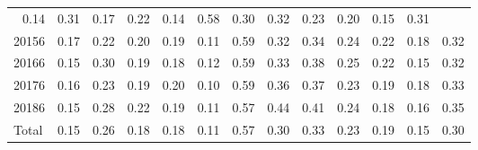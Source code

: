 \begin{table}[!h]
\begin{tabular}{lllllllllllll}
  \multicolumn{1}{|r}{0.14} &
  \multicolumn{1}{r}{0.31} &
  \multicolumn{1}{r}{0.17} &
  \multicolumn{1}{r}{0.22} &
  \multicolumn{1}{r}{0.14} &
  \multicolumn{1}{r}{0.58} &
  \multicolumn{1}{r}{0.30} &
  \multicolumn{1}{r}{0.32} &
  \multicolumn{1}{r}{0.23} &
  \multicolumn{1}{r}{0.20} &
  \multicolumn{1}{r}{0.15} &
  \multicolumn{1}{r}{0.31} \\
\multicolumn{1}{l}{\hspace{1em}20156} &
  \multicolumn{1}{|r}{0.17} &
  \multicolumn{1}{r}{0.22} &
  \multicolumn{1}{r}{0.20} &
  \multicolumn{1}{r}{0.19} &
  \multicolumn{1}{r}{0.11} &
  \multicolumn{1}{r}{0.59} &
  \multicolumn{1}{r}{0.32} &
  \multicolumn{1}{r}{0.34} &
  \multicolumn{1}{r}{0.24} &
  \multicolumn{1}{r}{0.22} &
  \multicolumn{1}{r}{0.18} &
  \multicolumn{1}{r}{0.32} \\
\multicolumn{1}{l}{\hspace{1em}20166} &
  \multicolumn{1}{|r}{0.15} &
  \multicolumn{1}{r}{0.30} &
  \multicolumn{1}{r}{0.19} &
  \multicolumn{1}{r}{0.18} &
  \multicolumn{1}{r}{0.12} &
  \multicolumn{1}{r}{0.59} &
  \multicolumn{1}{r}{0.33} &
  \multicolumn{1}{r}{0.38} &
  \multicolumn{1}{r}{0.25} &
  \multicolumn{1}{r}{0.22} &
  \multicolumn{1}{r}{0.15} &
  \multicolumn{1}{r}{0.32} \\
\multicolumn{1}{l}{\hspace{1em}20176} &
  \multicolumn{1}{|r}{0.16} &
  \multicolumn{1}{r}{0.23} &
  \multicolumn{1}{r}{0.19} &
  \multicolumn{1}{r}{0.20} &
  \multicolumn{1}{r}{0.10} &
  \multicolumn{1}{r}{0.59} &
  \multicolumn{1}{r}{0.36} &
  \multicolumn{1}{r}{0.37} &
  \multicolumn{1}{r}{0.23} &
  \multicolumn{1}{r}{0.19} &
  \multicolumn{1}{r}{0.18} &
  \multicolumn{1}{r}{0.33} \\
\multicolumn{1}{l}{\hspace{1em}20186} &
  \multicolumn{1}{|r}{0.15} &
  \multicolumn{1}{r}{0.28} &
  \multicolumn{1}{r}{0.22} &
  \multicolumn{1}{r}{0.19} &
  \multicolumn{1}{r}{0.11} &
  \multicolumn{1}{r}{0.57} &
  \multicolumn{1}{r}{0.44} &
  \multicolumn{1}{r}{0.41} &
  \multicolumn{1}{r}{0.24} &
  \multicolumn{1}{r}{0.18} &
  \multicolumn{1}{r}{0.16} &
  \multicolumn{1}{r}{0.35} \\
\multicolumn{1}{l}{\hspace{1em}Total} &
  \multicolumn{1}{|r}{0.15} &
  \multicolumn{1}{r}{0.26} &
  \multicolumn{1}{r}{0.18} &
  \multicolumn{1}{r}{0.18} &
  \multicolumn{1}{r}{0.11} &
  \multicolumn{1}{r}{0.57} &
  \multicolumn{1}{r}{0.30} &
  \multicolumn{1}{r}{0.33} &
  \multicolumn{1}{r}{0.23} &
  \multicolumn{1}{r}{0.19} &
  \multicolumn{1}{r}{0.15} &
  \multicolumn{1}{r}{0.30} \\
\cline{1-13}
\end{tabular}
\end{table}
